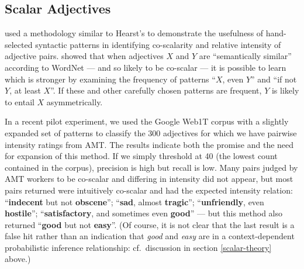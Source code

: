 \documentclass[10pt]{article}
\begin{document}
 
\vspace{-.1in}
\subsection{\label{scalar}Scalar Adjectives}

\vspace {-3mm}

\cite{sheinmanetal2013,sheinman2009adjscales} used a methodology similar to Hearst's \cite{hearst1992automatic} to demonstrate the usefulness of  hand-selected syntactic patterns in identifying co-scalarity and relative intensity of adjective pairs. 
\cite{sheinmanetal2013} showed that when adjectives $X$ and $Y$ are ``semantically similar'' according to WordNet --- and so likely to be co-scalar --- it is possible to learn which is stronger by examining the frequency of patterns ``$X$, even $Y$'' and ``if not $Y$, at least $X$''. If these and other carefully chosen patterns are frequent, $Y$ is likely to entail $X$ asymmetrically.

In a recent pilot experiment, we used the Google Web1T corpus with a slightly expanded set of patterns to classify the 300 adjectives for which we have pairwise intensity ratings from AMT. The results indicate both the promise and the need for expansion of this method. If we simply threshold at 40 (the lowest count contained in the corpus), precision is high but recall is low. Many pairs judged by AMT workers to be co-scalar and differing in intensity did not appear, but most pairs returned were intuitively co-scalar and had the expected intensity relation: ``\textbf{indecent} but not \textbf{obscene}''; ``\textbf{sad}, almost \textbf{tragic}''; ``\textbf{unfriendly}, even \textbf{hostile}''; ``\textbf{satisfactory}, and sometimes even \textbf{good}''  --- but this method also returned ``\textbf{good} but not \textbf{easy}''. (Of course, it is not clear that the last result is a false hit rather than an indication that \emph{good} and \emph{easy} are in a context-dependent probabilistic inference relationship: cf.\ discussion in section \ref{scalar-theory} above.)
\end{document}
